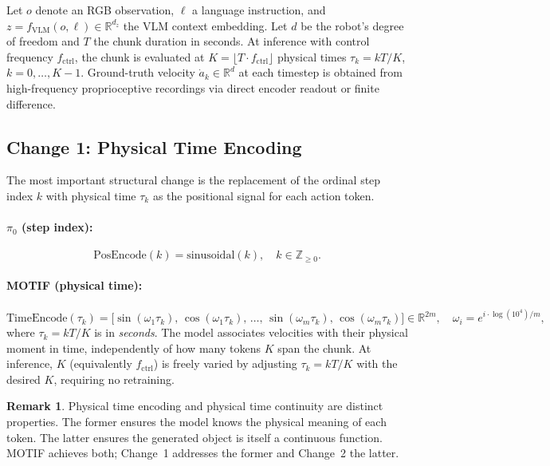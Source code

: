 \documentclass[11pt]{article}
\theoremstyle{plain}
\theoremstyle{definition}
\newtheorem{remark}[theorem]{Remark}
\newcommand{\R}{\mathbb{R}}
\newcommand{\texec}{\tau}
\newcommand{\bz}{z}
\begin{document}
Let $o$ denote an RGB observation, $\ell$ a language instruction, and
$\bz = f_{\mathrm{VLM}}(o,\ell) \in \R^{d_z}$ the VLM context embedding.
Let $d$ be the robot's degree of freedom and $T$ the chunk duration in seconds.
At inference with control frequency $f_{\mathrm{ctrl}}$, the chunk is
evaluated at $K = \lfloor T \cdot f_{\mathrm{ctrl}} \rfloor$ physical
times $\texec_k = kT/K$, $k = 0,\ldots,K-1$.
Ground-truth velocity $\dot{a}_k \in \R^d$ at each timestep is obtained
from high-frequency proprioceptive recordings via direct encoder readout
or finite difference.

\subsection{Change 1: Physical Time Encoding}
\label{sec:time_encoding}

The most important structural change is the replacement of the ordinal
step index $k$ with physical time $\texec_k$ as the positional signal
for each action token.

\paragraph{$\pi_0$ (step index):}
\begin{equation}
  \text{PosEncode}(k) = \text{sinusoidal}(k), \quad k \in \mathbb{Z}_{\geq 0}.
\end{equation}

\paragraph{MOTIF (physical time):}
\begin{equation}
  \label{eq:time_enc}
  \text{TimeEncode}(\texec_k) = \bigl[
    \sin(\omega_1 \texec_k),\,\cos(\omega_1 \texec_k),\,\ldots,\,
    \sin(\omega_m \texec_k),\,\cos(\omega_m \texec_k)
  \bigr] \in \R^{2m},
  \quad
  \omega_i = e^{i \cdot \log(10^4)/m},
\end{equation}
where $\texec_k = kT/K$ is in \emph{seconds}.
The model associates velocities with their physical moment in time,
independently of how many tokens $K$ span the chunk.
At inference, $K$ (equivalently $f_{\mathrm{ctrl}}$) is freely varied
by adjusting $\texec_k = kT/K$ with the desired $K$, requiring no retraining.

\begin{remark}
Physical time encoding and physical time continuity are distinct properties.
The former ensures the model knows the physical meaning of each token.
The latter ensures the generated object is itself a continuous function.
MOTIF achieves both; Change~1 addresses the former and Change~2 the latter.
\end{remark}
\end{document}
